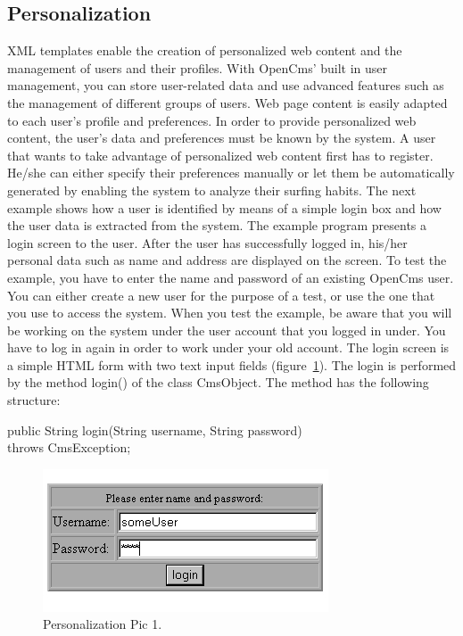 \subsection {Personalization}

XML templates enable the creation of personalized web content and
the management of users and their profiles. With OpenCms' built in user
management, you can store user-related data and use advanced features
such as the management of different groups of users.
Web page content is easily adapted to each user's profile and
preferences. In order to provide personalized web content, the user's
data and preferences must be known by the system. A user that wants to
take advantage of personalized web content first has to register. He/she
can either specify their preferences manually or let them be
automatically generated by enabling the system to analyze their surfing habits.
The next example shows how a user is identified by means of a simple
login box and how the user data is extracted from the system. The
example program presents a login screen to the user. After the user
has successfully logged in, his/her personal data such as name and
address are displayed on the screen.
To test the example, you have to enter the name and password of an
existing OpenCms user. You can either create a new user for the purpose
of a test, or use the one that you use to access the system. When you
test the example, be aware that you will be working on the system under
the user account that you logged in under. You have to log in again in
order to work under your old account.
The login screen is a simple HTML form with two text input fields 
(figure~\ref{Password}). 
The login is performed by the method {\meth login()} of the class 
{\class CmsObject}. The method has the following structure:

{\code public String login(String username, String password)\\
throws CmsException;}

\begin{figure}
\begin{center}
\includegraphics[clip,width=0.4\linewidth]{pics/modules/48}
\end{center}
\caption[Personalization Pic 1 ]{Personalization Pic 1.}
\label{Password}
\end{figure}

